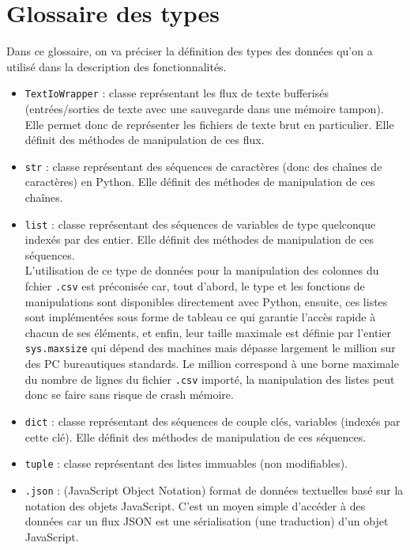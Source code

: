 	\section{Glossaire des types}
		Dans ce glossaire, on va préciser la définition des types des données qu'on a utilisé dans la description des fonctionnalités.
		\begin{itemize}
			\item \lstinline!TextIoWrapper! : classe représentant les flux de texte bufferisés (entrées/sorties de texte avec une sauvegarde dans une mémoire tampon). Elle permet donc de représenter les fichiers de texte brut en particulier. Elle définit des méthodes de manipulation de ces flux.
			\item \lstinline!str! : classe représentant des séquences de caractères (donc des chaînes de caractères) en Python. Elle définit des méthodes de manipulation de ces chaînes.
			\item \lstinline!list! : classe représentant des séquences de variables de type quelconque indexés par des entier. Elle définit des méthodes de manipulation de ces séquences.\\
				L'utilisation de ce type de données pour la manipulation des colonnes du fchier \lstinline!.csv! est préconisée car, tout d'abord, le type et les fonctions de manipulations sont disponibles directement avec Python, ensuite, ces listes sont implémentées sous forme de tableau ce qui garantie l'accès rapide à chacun de ses éléments, et enfin, leur taille maximale est définie par l'entier \lstinline!sys.maxsize! qui dépend des machines mais dépasse largement le million sur des PC bureautiques standards. Le million correspond à une borne maximale du nombre de lignes du fichier \lstinline!.csv! importé, la manipulation des listes peut donc se faire sans risque de crash mémoire.
			\item \lstinline!dict! : classe représentant des séquences de couple clés, variables (indexés par cette clé). Elle définit des méthodes de manipulation de ces séquences.		
			\item \lstinline!tuple! : classe représentant des listes immuables (non modifiables).
			\item \lstinline!.json! : (JavaScript Object Notation) format de données textuelles basé sur la notation des objets JavaScript. C'est un moyen simple d'accéder à des données car un flux JSON est une sérialisation (une traduction) d'un objet JavaScript.
 		\end{itemize}
	
